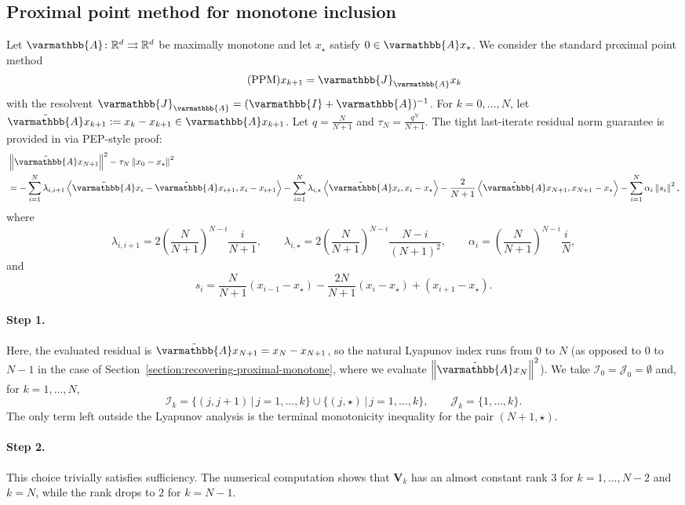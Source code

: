 \documentclass{article}
\theoremstyle{definition}
\theoremstyle{plain}
\newcommand{\vV}{{\mathbf{V}}}
\newcommand{\cI}{{\mathcal{I}}}
\newcommand{\cJ}{{\mathcal{J}}}
\newcommand{\reals}{\mathbb{R}}
\newcommand{\opA}{{\varmathbb{A}}}
\newcommand{\opI}{{\varmathbb{I}}}
\newcommand{\opJ}{{\varmathbb{J}}}
\newcommand{\inprod}[2]{\left\langle #1,#2 \right\rangle}
\newcommand{\sqnorm}[1]{\left\| #1 \right\|^2}
\newcommand{\topa}{\tilde{\opA}}
\begin{document}
\subsection{Proximal point method for monotone inclusion}
\label{section:ppm}

Let $\opA\colon\reals^d\rightrightarrows\reals^d$ be maximally monotone and let $x_\star$ satisfy $0\in\opA x_\star$.
We consider the standard proximal point method
\begin{align}
\label{alg:ppm}
\tag{PPM}
    x_{k+1}=\opJ_{\opA}x_k 
\end{align}
with the resolvent $\opJ_\opA = (\opI + \opA)^{-1}$.
For $k=0,\dots,N$, let $\topa x_{k+1} := x_k-x_{k+1}\in\opA x_{k+1}$.
Let $q=\frac{N}{N+1}$ and $\tau_N=\frac{q^N}{N+1}$.
The tight last-iterate residual norm guarantee is provided in \citep{guTightSublinearConvergence2020} via PEP-style proof:
\begin{align}
\label{eqn:ppm-pep-proof}
    & \sqnorm{\topa x_{N+1}}-\tau_N\sqnorm{x_0-x_\star} \notag\\
    & = -\sum_{i=1}^{N} \lambda_{i,i+1}
    \inprod{\topa x_i-\topa x_{i+1}}{x_i-x_{i+1}}
    -\sum_{i=1}^{N} \lambda_{i,\star}
    \inprod{\topa x_i}{x_i-x_\star} -\frac{2}{N+1}\inprod{\topa x_{N+1}}{x_{N+1}-x_\star}
    -\sum_{i=1}^{N}\alpha_i\sqnorm{s_i} ,
\end{align}
where
\[
    \lambda_{i,i+1} = 2 \left( \frac{N}{N+1} \right)^{N-i}\frac{i}{N+1},
    \qquad
    \lambda_{i,\star} = 2\left( \frac{N}{N+1} \right)^{N-i}\frac{N-i}{(N+1)^2},
    \qquad
    \alpha_i = \left( \frac{N}{N+1} \right)^{N-i}\frac{i}{N},
\]
and
\[
    s_i = \frac{N}{N+1} (x_{i-1}-x_\star) - \frac{2N}{N+1}(x_i-x_\star) + (x_{i+1}-x_\star).
\]

\paragraph{Step 1.}
Here, the evaluated residual is $\topa x_{N+1} = x_N-x_{N+1}$, so the natural Lyapunov index runs from $0$ to $N$ 
(as opposed to $0$ to $N-1$ in the case of Section~\ref{section:recovering-proximal-monotone}, where we evaluate $\sqnorm{\topa x_N}$).
We take $\cI_0 = \cJ_0=\emptyset$ and, for $k=1,\dots,N$,
\[
    \cI_k
    =
    \{(j,j+1)\,|\,j=1,\dots,k\}
    \cup
    \{(j,\star)\,|\,j=1,\dots,k\},
    \qquad
    \cJ_k=\{1,\dots,k\}.
\]
The only term left outside the Lyapunov analysis is the terminal monotonicity inequality for the pair $(N+1,\star)$.

\paragraph{Step 2.}
This choice trivially satisfies sufficiency.
The numerical computation shows that $\vV_k$ has an almost constant rank $3$ for $k=1,\dots,N-2$ and $k=N$, 
while the rank drops to $2$ for $k=N-1$.
\end{document}
